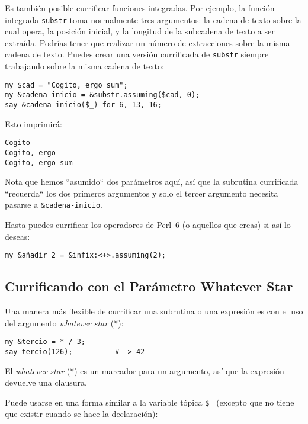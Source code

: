 Es también posible currificar funciones integradas. Por ejemplo,
la función integrada {\tt substr} toma normalmente tres argumentos:
la cadena de texto sobre la cual opera, la posición inicial, y la
longitud de la subcadena de texto a ser extraída. Podrías tener
que realizar un número de extracciones sobre la misma cadena de
texto. Puedes crear una versión currificada de {\tt substr} 
siempre trabajando sobre la misma cadena de texto:

\begin{verbatim}
my $cad = "Cogito, ergo sum";                     
my &cadena-inicio = &substr.assuming($cad, 0);
say &cadena-inicio($_) for 6, 13, 16; 
\end{verbatim}

Esto imprimirá:

\begin{verbatim}
Cogito
Cogito, ergo
Cogito, ergo sum
\end{verbatim}

Nota que hemos ``asumido`` dos parámetros aquí, así que la
subrutina currificada ``recuerda`` los dos primeros argumentos
y solo el tercer argumento necesita pasarse a 
\verb|&cadena-inicio|.

Hasta puedes currificar los operadores de Perl~6 (o aquellos
que creas) si así lo deseas:

\begin{verbatim}
my &añadir_2 = &infix:<+>.assuming(2);
\end{verbatim}

\subsection{Currificando con el Parámetro Whatever Star}
\label{whatever star parameter}

Una manera más flexible de currificar una subrutina o una 
expresión es con el uso del argumento \emph{whatever star} (*):

\begin{verbatim}
my &tercio = * / 3; 
say tercio(126);          # -> 42
\end{verbatim}

El \emph{whatever star} (*) es un marcador para un argumento, así
que la expresión devuelve una clausura.

Puede usarse en una forma similar a la variable tópica \verb|$_| 
(excepto que no tiene que existir cuando se hace la declaración):

